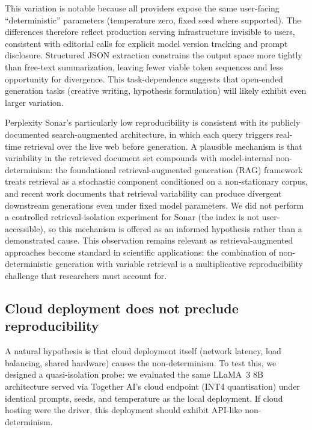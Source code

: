 \documentclass[sn-nature]{sn-jnl}
\begin{document}
This variation is notable because all providers expose the same user-facing ``deterministic'' parameters (temperature zero, fixed seed where supported).
The differences therefore reflect production serving infrastructure invisible to users, consistent with editorial calls for explicit model version tracking and prompt disclosure\cite{editorial2024framework}.
Structured JSON extraction constrains the output space more tightly than free-text summarization, leaving fewer viable token sequences and less opportunity for divergence.
This task-dependence suggests that open-ended generation tasks (creative writing, hypothesis formulation) will likely exhibit even larger variation.

Perplexity Sonar's particularly low reproducibility is consistent with its publicly documented search-augmented architecture\cite{perplexitysonar2024}, in which each query triggers real-time retrieval over the live web before generation.
A plausible mechanism is that variability in the retrieved document set compounds with model-internal non-determinism: the foundational retrieval-augmented generation (RAG) framework\cite{lewis2020rag} treats retrieval as a stochastic component conditioned on a non-stationary corpus, and recent work documents that retrieval variability can produce divergent downstream generations even under fixed model parameters\cite{shi2024ragvariability}.
We did not perform a controlled retrieval-isolation experiment for Sonar (the index is not user-accessible), so this mechanism is offered as an informed hypothesis rather than a demonstrated cause.
This observation remains relevant as retrieval-augmented approaches become standard in scientific applications: the combination of non-deterministic generation with variable retrieval is a multiplicative reproducibility challenge that researchers must account for.


\subsection{Cloud deployment does not preclude reproducibility}\label{subsec:cloud}

A natural hypothesis is that cloud deployment itself (network latency, load balancing, shared hardware) causes the non-determinism.
To test this, we designed a quasi-isolation probe: we evaluated the same LLaMA~3 8B architecture served via Together AI's cloud endpoint (INT4 quantisation) under identical prompts, seeds, and temperature as the local deployment.
If cloud hosting were the driver, this deployment should exhibit API-like non-determinism.
\end{document}
